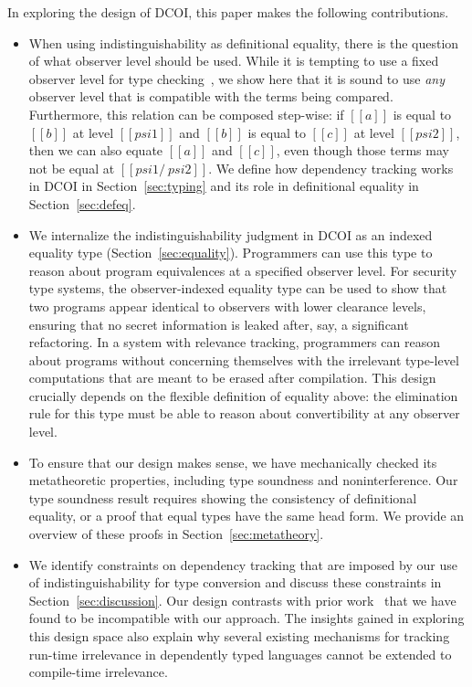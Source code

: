 \documentclass[acmsmall]{acmart}
\newcommand{\jws}[1]{}
\newcommand{\name}{DCOI\xspace}
\begin{document}
\medskip
In exploring the design of DCOI, this paper makes the following contributions.
\begin{itemize}
\item When using indistinguishability as definitional equality, there is the
  question of what observer level should be used. While it is tempting to use
  a fixed observer level for type checking~\citep{choudhury:ddc}, we show here
  that it is sound to use \emph{any} observer level that is compatible with
  the terms being compared. Furthermore, this relation can be composed
  step-wise: if $[[a]]$ is equal to $[[b]]$ at level $[[psi1]]$ and $[[b]]$ is
  equal to $[[c]]$ at level $[[psi2]]$, then we can also equate $[[a]]$ and
  $[[c]]$, even though those terms may not be equal at $[[psi1 /\ psi2]]$.
  We define how
  dependency tracking works in \name{} in Section~\ref{sec:typing} and 
  its role in definitional equality in Section~\ref{sec:defeq}.

\item We internalize the indistinguishability judgment in \name{}
  as an indexed equality type (Section~\ref{sec:equality}). Programmers can
  use this type to reason about program equivalences at a specified observer
  level. For security type systems, the observer-indexed equality type can be
  used to show that two programs appear identical to observers with lower
  clearance levels, ensuring that no secret information is leaked after, say,
  a significant refactoring.  In a system with relevance tracking, programmers
  can reason about programs without concerning themselves with the irrelevant
  type-level computations that are meant to be erased after compilation.
  This design crucially depends on the flexible definition of equality above:
  the elimination rule for this type must be able to reason about
  convertibility at any observer level.

\item To ensure that our design makes sense, we have mechanically checked its
  metatheoretic properties, including type soundness and noninterference. Our
  type soundness result requires showing the consistency of definitional
  equality, or a proof that equal types have the same head form. We provide an
  overview of these proofs in Section~\ref{sec:metatheory}.

\item We identify constraints on dependency tracking that are imposed
  by our use of indistinguishability for type conversion and discuss these 
  constraints in Section~\ref{sec:discussion}. 
  Our design contrasts with prior
  work~\citep{abadi1999core,shikuma2008proving, choudhury:ddc}
  that we have found to be incompatible with our approach. The insights
  gained in exploring this design space also explain why several
  existing mechanisms for tracking run-time irrelevance in dependently typed
  languages cannot be extended to compile-time irrelevance.


\end{itemize}
\end{document}

